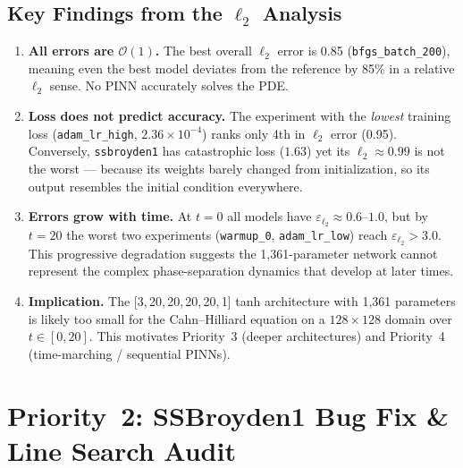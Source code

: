 \documentclass[11pt,a4paper]{article}
\begin{document}
\subsection{Key Findings from the $\ell_2$ Analysis}

\begin{enumerate}
  \item \textbf{All errors are $\mathcal{O}(1)$.}  The best overall
        $\ell_2$ error is 0.85 (\texttt{bfgs\_batch\_200}), meaning
        even the best model deviates from the reference by 85\% in a
        relative $\ell_2$ sense.  No PINN accurately solves the PDE.

  \item \textbf{Loss does not predict accuracy.}  The experiment with
        the \emph{lowest} training loss (\texttt{adam\_lr\_high},
        $2.36 \times 10^{-4}$) ranks only 4th in $\ell_2$ error
        (0.95).  Conversely, \texttt{ssbroyden1} has catastrophic loss
        ($1.63$) yet its $\ell_2 \approx 0.99$ is not the worst ---
        because its weights barely changed from initialization, so its
        output resembles the initial condition everywhere.

  \item \textbf{Errors grow with time.}  At $t{=}0$ all models have
        $\varepsilon_{\ell_2} \approx 0.6$--$1.0$, but by $t{=}20$
        the worst two experiments (\texttt{warmup\_0},
        \texttt{adam\_lr\_low}) reach $\varepsilon_{\ell_2} > 3.0$.
        This progressive degradation suggests the 1{,}361-parameter
        network cannot represent the complex phase-separation dynamics
        that develop at later times.

  \item \textbf{Implication.}  The [3,\,20,\,20,\,20,\,20,\,1] tanh
        architecture with 1{,}361 parameters is likely too small for
        the Cahn--Hilliard equation on a $128 \times 128$ domain over
        $t \in [0, 20]$.  This motivates Priority~3 (deeper
        architectures) and Priority~4 (time-marching / sequential
        PINNs).
\end{enumerate}


\section{Priority~2: SSBroyden1 Bug Fix \& Line Search Audit}
\label{sec:ssbroyden1}
\end{document}
